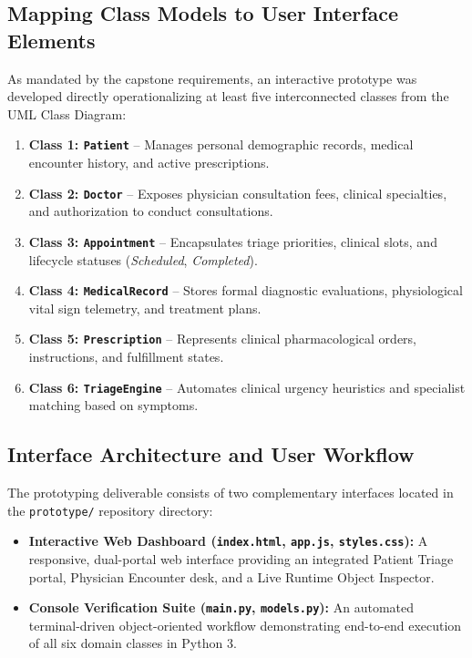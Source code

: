\documentclass[11pt,a4paper]{article}
\begin{document}
\subsection{Mapping Class Models to User Interface Elements}
As mandated by the capstone requirements, an interactive prototype was developed directly operationalizing at least five interconnected classes from the UML Class Diagram:
\begin{enumerate}
    \item \textbf{Class 1: \texttt{Patient}} -- Manages personal demographic records, medical encounter history, and active prescriptions.
    \item \textbf{Class 2: \texttt{Doctor}} -- Exposes physician consultation fees, clinical specialties, and authorization to conduct consultations.
    \item \textbf{Class 3: \texttt{Appointment}} -- Encapsulates triage priorities, clinical slots, and lifecycle statuses (\textit{Scheduled}, \textit{Completed}).
    \item \textbf{Class 4: \texttt{MedicalRecord}} -- Stores formal diagnostic evaluations, physiological vital sign telemetry, and treatment plans.
    \item \textbf{Class 5: \texttt{Prescription}} -- Represents clinical pharmacological orders, instructions, and fulfillment states.
    \item \textbf{Class 6: \texttt{TriageEngine}} -- Automates clinical urgency heuristics and specialist matching based on symptoms.
\end{enumerate}

\subsection{Interface Architecture and User Workflow}
The prototyping deliverable consists of two complementary interfaces located in the \texttt{prototype/} repository directory:
\begin{itemize}
    \item \textbf{Interactive Web Dashboard (\texttt{index.html}, \texttt{app.js}, \texttt{styles.css}):} A responsive, dual-portal web interface providing an integrated Patient Triage portal, Physician Encounter desk, and a Live Runtime Object Inspector.
    \item \textbf{Console Verification Suite (\texttt{main.py}, \texttt{models.py}):} An automated terminal-driven object-oriented workflow demonstrating end-to-end execution of all six domain classes in Python 3.
\end{itemize}
\end{document}
